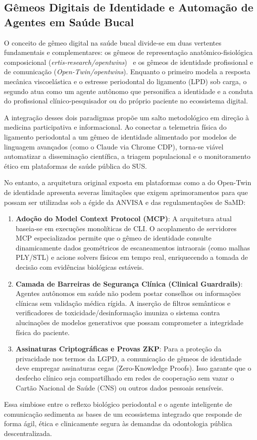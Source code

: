 \subsection{Gêmeos Digitais de Identidade e Automação de Agentes em Saúde Bucal}

O conceito de gêmeo digital na saúde bucal divide-se em duas vertentes fundamentais e complementares: os gêmeos de representação anatômico-fisiológica composicional (\textit{ertis-research/opentwins})~\cite{robles2023opentwins} e os gêmeos de identidade profissional e de comunicação (\textit{Open-Twin/opentwins}). Enquanto o primeiro modela a resposta mecânica viscoelástica e o estresse periodontal do ligamento (LPD) sob carga, o segundo atua como um agente autônomo que personifica a identidade e a conduta do profissional clínico-pesquisador ou do próprio paciente no ecossistema digital.

A integração desses dois paradigmas propõe um salto metodológico em direção à medicina participativa e informacional. Ao conectar a telemetria física do ligamento periodontal a um gêmeo de identidade alimentado por modelos de linguagem avançados (como o Claude via Chrome CDP), torna-se viável automatizar a disseminação científica, a triagem populacional e o monitoramento ético em plataformas de saúde pública do SUS. 

No entanto, a arquitetura original exposta em plataformas como a do Open-Twin de identidade apresenta severas limitações que exigem aprimoramentos para que possam ser utilizadas sob a égide da ANVISA e das regulamentações de SaMD:

\begin{enumerate}
    \item \textbf{Adoção do Model Context Protocol (MCP)}: A arquitetura atual baseia-se em execuções monolíticas de CLI. O acoplamento de servidores MCP especializados permite que o gêmeo de identidade consulte dinamicamente dados geométricos de escaneamentos intraorais (como malhas PLY/STL) e acione solvers físicos em tempo real, enriquecendo a tomada de decisão com evidências biológicas estáveis.
    \item \textbf{Camada de Barreiras de Segurança Clínica (Clinical Guardrails)}: Agentes autônomos em saúde não podem postar conselhos ou informações clínicas sem validação médica rígida. A inserção de filtros semânticos e verificadores de toxicidade/desinformação imuniza o sistema contra alucinações de modelos generativos que possam comprometer a integridade física do paciente.
    \item \textbf{Assinaturas Criptográficas e Provas ZKP}: Para a proteção da privacidade nos termos da LGPD, a comunicação de gêmeos de identidade deve empregar assinaturas cegas (Zero-Knowledge Proofs). Isso garante que o desfecho clínico seja compartilhado em redes de cooperação sem vazar o Cartão Nacional de Saúde (CNS) ou outros dados pessoais sensíveis.
\end{enumerate}

Essa simbiose entre o reflexo biológico periodontal e o agente inteligente de comunicação sedimenta as bases de um ecossistema integrado que responde de forma ágil, ética e clinicamente segura às demandas da odontologia pública descentralizada.
